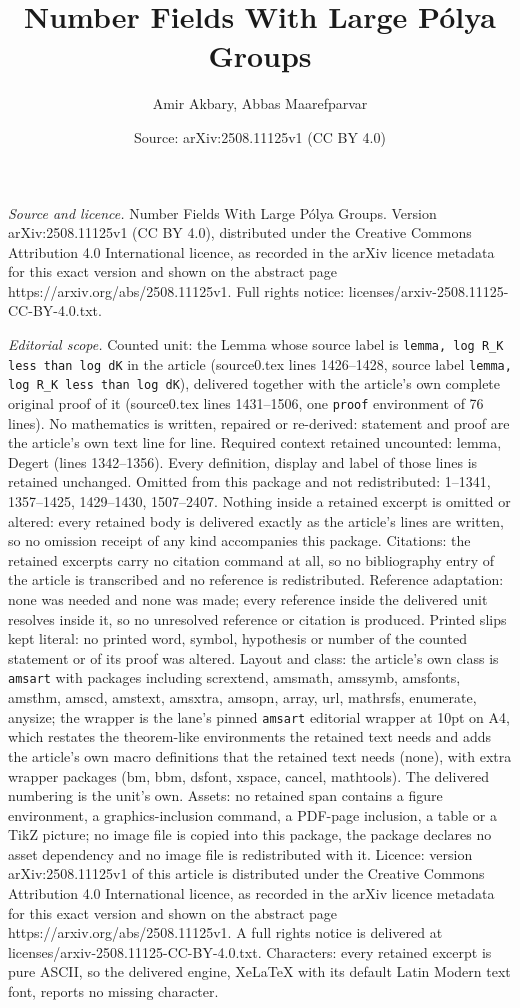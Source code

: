 \documentclass[10pt,a4paper]{amsart}
\title[Number Fields With Large P\'olya Groups]{Number Fields With Large P\'olya Groups}
\author{Amir Akbary, Abbas Maarefparvar}
\date{Source: arXiv:2508.11125v1 (CC BY 4.0)}
\begin{document}
\maketitle

\noindent\emph{Source and licence.} Number Fields With Large P\'olya Groups. Version arXiv:2508.11125v1 (CC BY 4.0), distributed under the Creative Commons Attribution 4.0 International licence, as recorded in the arXiv licence metadata for this exact version and shown on the abstract page https://arxiv.org/abs/2508.11125v1. Full rights notice: licenses/arxiv-2508.11125-CC-BY-4.0.txt.\par\smallskip

\noindent\textit{Editorial scope.} Counted unit: the Lemma whose source label is \texttt{lemma, log R\_K less than log dK} in the article (source0.tex lines 1426--1428, source label \texttt{lemma, log R\_K less than log dK}), delivered together with the article's own complete original proof of it (source0.tex lines 1431--1506, one \texttt{proof} environment of 76 lines). No mathematics is written, repaired or re-derived: statement and proof are the article's own text line for line. Required context retained uncounted: lemma, Degert (lines 1342--1356). Every definition, display and label of those lines is retained unchanged. Omitted from this package and not redistributed: 1--1341, 1357--1425, 1429--1430, 1507--2407. Nothing inside a retained excerpt is omitted or altered: every retained body is delivered exactly as the article's lines are written, so no omission receipt of any kind accompanies this package. Citations: the retained excerpts carry no citation command at all, so no bibliography entry of the article is transcribed and no reference is redistributed. Reference adaptation: none was needed and none was made; every reference inside the delivered unit resolves inside it, so no unresolved reference or citation is produced. Printed slips kept literal: no printed word, symbol, hypothesis or number of the counted statement or of its proof was altered. Layout and class: the article's own class is \texttt{amsart} with packages including scrextend, amsmath, amssymb, amsfonts, amsthm, amscd, amstext, amsxtra, amsopn, array, url, mathrsfs, enumerate, anysize; the wrapper is the lane's pinned \texttt{amsart} editorial wrapper at 10pt on A4, which restates the theorem-like environments the retained text needs and adds the article's own macro definitions that the retained text needs (none), with extra wrapper packages (bm, bbm, dsfont, xspace, cancel, mathtools). The delivered numbering is the unit's own. Assets: no retained span contains a figure environment, a graphics-inclusion command, a PDF-page inclusion, a table or a TikZ picture; no image file is copied into this package, the package declares no asset dependency and no image file is redistributed with it. Licence: version arXiv:2508.11125v1 of this article is distributed under the Creative Commons Attribution 4.0 International licence, as recorded in the arXiv licence metadata for this exact version and shown on the abstract page https://arxiv.org/abs/2508.11125v1. A full rights notice is delivered at licenses/arxiv-2508.11125-CC-BY-4.0.txt. Characters: every retained excerpt is pure ASCII, so the delivered engine, XeLaTeX with its default Latin Modern text font, reports no missing character.
\end{document}
